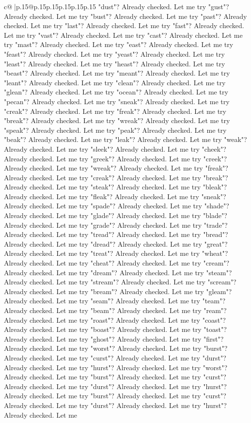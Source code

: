 \documentclass{article}
\begin{document}
{\begin{supertabular}{c@{$\;$}|p{.15\linewidth}@{}p{.15\linewidth}p{.15\linewidth}p{.15\linewidth}p{.15\linewidth}p{.15\linewidth}}
{{{"dust"? Already checked. Let me try "gust"? Already checked. Let me try "bust"? Already checked. Let me try "past"? Already checked. Let me try "last"? Already checked. Let me try "fast"? Already checked. Let me try "vast"? Already checked. Let me try "cast"? Already checked. Let me try "mast"? Already checked. Let me try "east"? Already checked. Let me try "feast"? Already checked. Let me try "yeast"? Already checked. Let me try "least"? Already checked. Let me try "heast"? Already checked. Let me try "beast"? Already checked. Let me try "meant"? Already checked. Let me try "leant"? Already checked. Let me try "clean"? Already checked. Let me try "glean"? Already checked. Let me try "ocean"? Already checked. Let me try "pecan"? Already checked. Let me try "sneak"? Already checked. Let me try "creak"? Already checked. Let me try "freak"? Already checked. Let me try "break"? Already checked. Let me try "wreak"? Already checked. Let me try "speak"? Already checked. Let me try "peak"? Already checked. Let me try "beak"? Already checked. Let me try "leak"? Already checked. Let me try "weak"? Already checked. Let me try "sleek"? Already checked. Let me try "cheek"? Already checked. Let me try "greek"? Already checked. Let me try "creek"? Already checked. Let me try "wreak"? Already checked. Let me try "freak"? Already checked. Let me try "creak"? Already checked. Let me try "break"? Already checked. Let me try "steak"? Already checked. Let me try "bleak"? Already checked. Let me try "fleak"? Already checked. Let me try "sneak"? Already checked. Let me try "spade"? Already checked. Let me try "shade"? Already checked. Let me try "glade"? Already checked. Let me try "blade"? Already checked. Let me try "grade"? Already checked. Let me try "trade"? Already checked. Let me try "tread"? Already checked. Let me try "bread"? Already checked. Let me try "dread"? Already checked. Let me try "great"? Already checked. Let me try "treat"? Already checked. Let me try "wheat"? Already checked. Let me try "cheat"? Already checked. Let me try "cream"? Already checked. Let me try "dream"? Already checked. Let me try "steam"? Already checked. Let me try "stream"? Already checked. Let me try "scream"? Already checked. Let me try "bream"? Already checked. Let me try "gleam"? Already checked. Let me try "seam"? Already checked. Let me try "team"? Already checked. Let me try "beam"? Already checked. Let me try "ream"? Already checked. Let me try "roast"? Already checked. Let me try "coast"? Already checked. Let me try "boast"? Already checked. Let me try "toast"? Already checked. Let me try "ghost"? Already checked. Let me try "first"? Already checked. Let me try "worst"? Already checked. Let me try "burst"? Already checked. Let me try "curst"? Already checked. Let me try "durst"? Already checked. Let me try "hurst"? Already checked. Let me try "worst"? Already checked. Let me try "burst"? Already checked. Let me try "curst"? Already checked. Let me try "durst"? Already checked. Let me try "hurst"? Already checked. Let me try "burst"? Already checked. Let me try "curst"? Already checked. Let me try "durst"? Already checked. Let me try "hurst"? Already checked. Let me }}}
\end{supertabular}}
\end{document}
